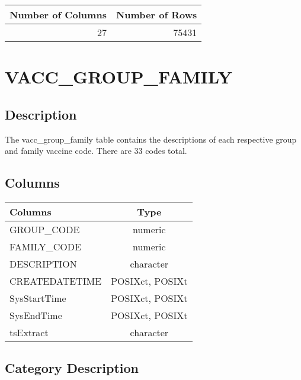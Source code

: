 \documentclass[
  letterpaper,
  DIV=11,
  numbers=noendperiod]{scrreprt}
\begin{document}
\begin{longtable}{rr}
\toprule
Number of Columns & Number of Rows \\ 
\midrule
27 & 75431 \\ 
\bottomrule
\end{longtable}

\hypertarget{vacc_group_family}{%
\chapter*{VACC\_GROUP\_FAMILY}\label{vacc_group_family}}

\hypertarget{description-42}{%
\section*{Description}\label{description-42}}

The vacc\_group\_family table contains the descriptions of each
respective group and family vaccine code. There are 33 codes total.

\hypertarget{columns-42}{%
\section*{Columns}\label{columns-42}}

\begin{longtable}{lc}
\toprule
Columns & Type \\ 
\midrule
GROUP\_CODE & numeric \\ 
FAMILY\_CODE & numeric \\ 
DESCRIPTION & character \\ 
CREATEDATETIME & POSIXct, POSIXt \\ 
SysStartTime & POSIXct, POSIXt \\ 
SysEndTime & POSIXct, POSIXt \\ 
tsExtract & character \\ 
\bottomrule
\end{longtable}

\hypertarget{category-description-42}{%
\section*{Category Description}\label{category-description-42}}
\end{document}
